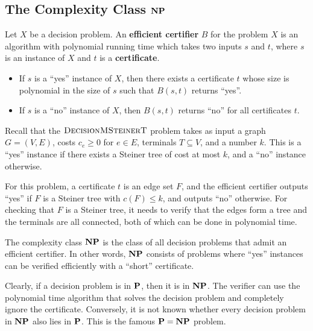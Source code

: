 \subsection{The Complexity Class $\mathbf{NP}$} \label{subsec:6.3}
Let $X$ be a decision problem. An {\bf efficient certifier} $B$ for the 
problem $X$ is an algorithm with polynomial running time which takes 
two inputs $s$ and $t$, where $s$ is an instance of $X$ and $t$ is a 
{\bf certificate}. 
\begin{itemize}
    \item If $s$ is a ``yes'' instance of $X$, then there exists a certificate 
    $t$ whose size is polynomial in the size of $s$ such that $B(s, t)$ 
    returns ``yes''.
    \item If $s$ is a ``no'' instance of $X$, then $B(s, t)$ returns ``no'' 
    for all certificates $t$. 
\end{itemize}
Recall that the $\textsc{DecisionMSteinerT}$ problem takes as input a 
graph $G = (V, E)$, costs $c_e \geq 0$ for $e \in E$, terminals $T \subseteq V$, 
and a number $k$. This is a ``yes'' instance if there exists a Steiner tree 
of cost at most $k$, and a ``no'' instance otherwise. 

For this problem, 
a certificate $t$ is an edge set $F$, and the efficient certifier 
outputs ``yes'' if $F$ is a Steiner tree with $c(F) \leq k$, and outputs ``no'' 
otherwise. For checking that $F$ is a Steiner tree, it needs to verify that 
the edges form a  tree and the terminals are all connected, both of which can be 
done in polynomial time.

The complexity class $\mathbf{NP}$ is the class of all decision problems that admit 
an efficient certifier. In other words, $\mathbf{NP}$ consists of problems where 
``yes'' instances can be verified efficiently with a ``short'' certificate.

Clearly, if a decision problem is in $\mathbf{P}$, then it is in $\mathbf{NP}$. 
The verifier can use the polynomial time algorithm that solves the 
decision problem and completely ignore the certificate.
Conversely, it is not known whether every decision problem in $\mathbf{NP}$ 
also lies in $\mathbf{P}$. This is the famous $\mathbf{P} = \mathbf{NP}$ problem. 
